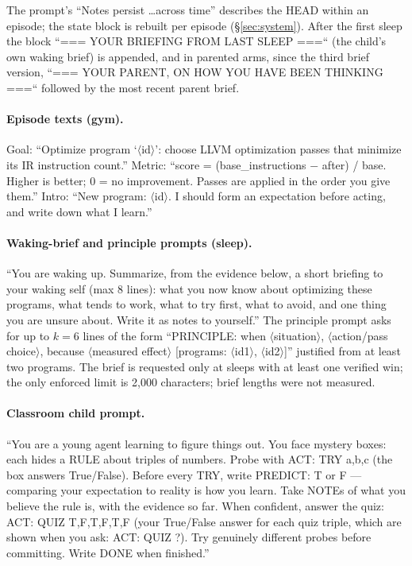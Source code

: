 \documentclass{article}
\begin{document}
The prompt's ``Notes persist \ldots across time'' describes the HEAD within an episode; the state block is rebuilt per episode (\S\ref{sec:system}). After the first sleep the block ``=== YOUR BRIEFING FROM LAST SLEEP ===`` (the child's own waking brief) is appended, and in parented arms, since the third brief version, ``=== YOUR PARENT, ON HOW YOU HAVE BEEN THINKING ===`` followed by the most recent parent brief.

\paragraph{Episode texts (gym).} Goal: ``Optimize program `$\langle$id$\rangle$': choose LLVM optimization passes that minimize its IR instruction count.'' Metric: ``score = (base\_instructions $-$ after) / base. Higher is better; 0 = no improvement. Passes are applied in the order you give them.'' Intro: ``New program: $\langle$id$\rangle$. I should form an expectation before acting, and write down what I learn.''

\paragraph{Waking-brief and principle prompts (sleep).} ``You are waking up. Summarize, from the evidence below, a short briefing to your waking self (max 8 lines): what you now know about optimizing these programs, what tends to work, what to try first, what to avoid, and one thing you are unsure about. Write it as notes to yourself.'' The principle prompt asks for up to $k=6$ lines of the form ``PRINCIPLE: when $\langle$situation$\rangle$, $\langle$action/pass choice$\rangle$, because $\langle$measured effect$\rangle$ [programs: $\langle$id1$\rangle$, $\langle$id2$\rangle$]'' justified from at least two programs. The brief is requested only at sleeps with at least one verified win; the only enforced limit is 2{,}000 characters; brief lengths were not measured.

\paragraph{Classroom child prompt.} ``You are a young agent learning to figure things out. You face mystery boxes: each hides a RULE about triples of numbers. Probe with ACT: TRY a,b,c (the box answers True/False). Before every TRY, write PREDICT: T or F --- comparing your expectation to reality is how you learn. Take NOTEs of what you believe the rule is, with the evidence so far. When confident, answer the quiz: ACT: QUIZ T,F,T,F,T,F (your True/False answer for each quiz triple, which are shown when you ask: ACT: QUIZ ?). Try genuinely different probes before committing. Write DONE when finished.''
\end{document}
